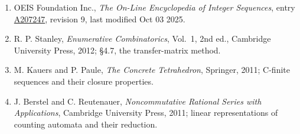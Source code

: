 \documentclass[11pt]{article}
\theoremstyle{definition}
\begin{document}
\begin{enumerate}

\item OEIS Foundation Inc., \emph{The On-Line Encyclopedia of Integer Sequences}, entry \href{https://oeis.org/A207247}{A207247}, revision 9, last modified Oct 03 2025.

\item R. P. Stanley, \emph{Enumerative Combinatorics}, Vol.~1, 2nd ed., Cambridge University Press, 2012; \S4.7, the transfer-matrix method.

\item M. Kauers and P. Paule, \emph{The Concrete Tetrahedron}, Springer, 2011; C-finite sequences and their closure properties.

\item J. Berstel and C. Reutenauer, \emph{Noncommutative Rational Series with Applications}, Cambridge University Press, 2011; linear representations of counting automata and their reduction.

\end{enumerate}
\end{document}
